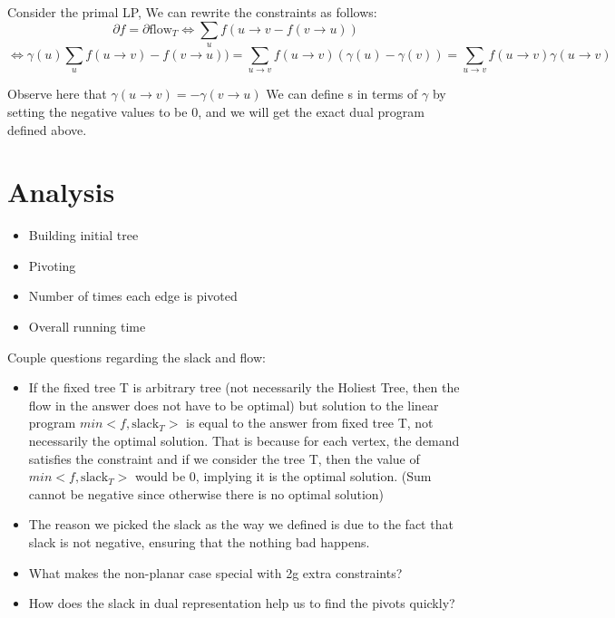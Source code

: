 \documentclass{article}
\begin{document}
Consider the primal LP, We can rewrite the constraints as follows:
\[ \partial f = \partial \text{flow}_T \Longleftrightarrow \sum 
  \limits_u f(u \rightarrow v - f(v \rightarrow u)) \]
\[ \Longleftrightarrow \gamma (u)\sum_u f(u \rightarrow v) - f(v \rightarrow u)) = 
  \sum \limits_{u \rightarrow v} f(u \rightarrow v) (\gamma (u) - \gamma (v)) = 
  \sum \limits_{u \rightarrow v} f(u \rightarrow v) \gamma (u \rightarrow v)\]

Observe here that $\gamma (u \rightarrow v) = - \gamma (v \rightarrow u)$
We can define s in terms of $\gamma $ by setting the negative values to be 0, 
and we will get the exact dual program defined above.

\section{Analysis}
\begin{itemize}
\item Building initial tree
\item Pivoting
\item Number of times each edge is pivoted
\item Overall running time
\end{itemize}

Couple questions regarding the slack and flow:
\begin{itemize}
\item If the fixed tree T is arbitrary tree (not necessarily the Holiest Tree, 
then the flow in the answer does not have to be optimal) but solution to the 
linear program $min <f, \text{slack}_T>$ is equal to the answer from fixed tree T, 
not necessarily the optimal solution. That is because for each vertex, the 
demand satisfies the constraint and if we consider the tree T, then the value of 
$min <f, \text{slack}_T>$ would be 0, implying it is the optimal solution. 
(Sum cannot be negative since otherwise there is no optimal solution)
\item The reason we picked the slack as the way we defined is due to the fact 
that slack is not negative, ensuring that the nothing bad happens.
\item What makes the non-planar case special with 2g extra constraints?
\item How does the slack in dual representation help us to find the pivots quickly?
\end{itemize}
\end{document}
